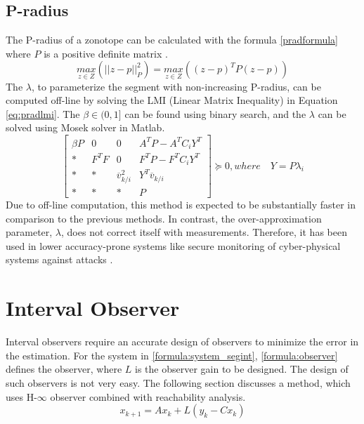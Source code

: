 \subsection{P-radius}
The P-radius of a zonotope can be calculated with the formula \eqref{pradformula} where $P$ is a positive definite matrix \cite{Alamo2005}.
\begin{equation}
\label{pradformula}
\underset{z \in Z}{max} (||z - p||^2_{P}) = \underset{z \in Z}{max}((z-p)^T P (z-p))
\end{equation}
The $\lambda$, to parameterize the segment with non-increasing P-radius, can be computed off-line by solving the LMI (Linear Matrix Inequality) in Equation \eqref{eq:pradlmi}. The $\beta \in (0,1]$ can be found using binary search, and the $\lambda$ can be solved using Mosek solver in Matlab\textsuperscript{\tiny\textregistered}.
\begin{equation}
\label{eq:pradlmi}
\left[
\begin{matrix}
\beta P & 0 & 0 & A^TP - A^TC_iY^T\\
* & F^TF & 0 & F^TP -F^TC_iY^T\\
* & * & \overline{v}_{k/i}^2 & Y^T\overline{v}_{k/i}\\
* & * & * & P
\end{matrix}\right] \succeq 0,
where\quad Y = P\lambda_i
\end{equation}
Due to off-line computation, this method is expected to be substantially faster in comparison to the previous methods. In contrast, the over-approximation parameter, $\lambda$, does not correct itself with measurements. Therefore, it has been used in lower accuracy-prone systems like secure monitoring of cyber-physical systems against attacks \cite{GE20201592}. 

\section{Interval Observer}
Interval observers require an accurate design of observers to minimize the error in the estimation. For the system in \eqref{formula:system_segint}, \eqref{formula:observer} defines the observer, where $L$ is the observer gain to be designed. The design of such observers is not very easy. The following section discusses a method, which uses H-$\infty$ observer combined with reachability analysis.
\begin{equation}
\label{formula:observer}
x_{k+1} = Ax_k + L(y_k -Cx_k)
\end{equation}


